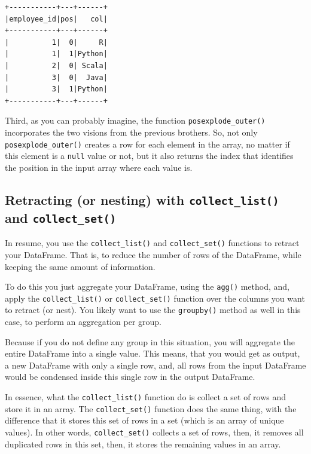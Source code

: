 \documentclass[
  11pt,
  letterpaper,
  DIV=11,
  numbers=noendperiod]{scrreprt}
\begin{document}
\begin{verbatim}
+-----------+---+------+
|employee_id|pos|   col|
+-----------+---+------+
|          1|  0|     R|
|          1|  1|Python|
|          2|  0| Scala|
|          3|  0|  Java|
|          3|  1|Python|
+-----------+---+------+
\end{verbatim}

Third, as you can probably imagine, the function
\texttt{posexplode\_outer()} incorporates the two visions from the
previous brothers. So, not only \texttt{posexplode\_outer()} creates a
row for each element in the array, no matter if this element is a
\texttt{null} value or not, but it also returns the index that
identifies the position in the input array where each value is.

\subsection{\texorpdfstring{Retracting (or nesting) with
\texttt{collect\_list()} and
\texttt{collect\_set()}}{Retracting (or nesting) with collect\_list() and collect\_set()}}\label{retracting-or-nesting-with-collect_list-and-collect_set}

In resume, you use the \texttt{collect\_list()} and
\texttt{collect\_set()} functions to retract your DataFrame. That is, to
reduce the number of rows of the DataFrame, while keeping the same
amount of information.

To do this you just aggregate your DataFrame, using the \texttt{agg()}
method, and, apply the \texttt{collect\_list()} or
\texttt{collect\_set()} function over the columns you want to retract
(or nest). You likely want to use the \texttt{groupby()} method as well
in this case, to perform an aggregation per group.

Because if you do not define any group in this situation, you will
aggregate the entire DataFrame into a single value. This means, that you
would get as output, a new DataFrame with only a single row, and, all
rows from the input DataFrame would be condensed inside this single row
in the output DataFrame.

In essence, what the \texttt{collect\_list()} function do is collect a
set of rows and store it in an array. The \texttt{collect\_set()}
function does the same thing, with the difference that it stores this
set of rows in a set (which is an array of unique values). In other
words, \texttt{collect\_set()} collects a set of rows, then, it removes
all duplicated rows in this set, then, it stores the remaining values in
an array.
\end{document}
